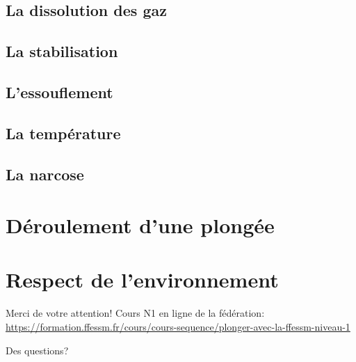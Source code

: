 \documentclass{beamer}
\begin{document}
\subsection{La dissolution des gaz}


\subsection{La stabilisation}


\subsection{L'essouflement}


\subsection{La température}


\subsection{La narcose}


\section{Déroulement d'une plongée}


\section{Respect de l'environnement}


\begin{frame}{Merci de votre attention!}
Cours N1 en ligne de la fédération:\\\url{https://formation.ffessm.fr/cours/cours-sequence/plonger-avec-la-ffessm-niveau-1}
\begin{center}
\Huge Des questions?
\end{center}
\end{frame}
\end{document}
